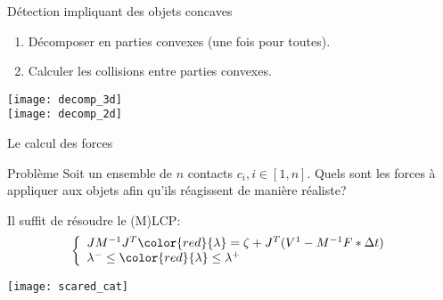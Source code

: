 \begin{frame}{Détection impliquant des objets concaves}
    \begin{enumerate}
        \item Décomposer en parties convexes (une fois pour toutes).
        \item Calculer les collisions entre parties convexes.
    \end{enumerate}
    \begin{center}
        \texttt{[image: decomp\_3d]}\\
        \texttt{[image: decomp\_2d]}
    \end{center}
\end{frame}

\begin{frame}{Le calcul des forces}
    \begin{block}{Problème}
         Soit un ensemble de $n$ contacts $c_i, i \in [1, n]$. Quels sont les
         forces à appliquer aux objets afin qu’ils réagissent de manière
         réaliste?
    \end{block}
    \pause
    Il suffit de résoudre le (M)LCP:
    \[
    \left\{
        \begin{array}{l}
            JM^{-1}J^T {\color{red}{\lambda}} = \zeta +
            J^T(V^1 - M^{-1}F * \Delta t)\\
            \lambda^- \leq {\color{red}{\lambda}} \leq \lambda^+ %
        \end{array}
    \right.
    \]
    \begin{center}
        \texttt{[image: scared\_cat]}
    \end{center}
\end{frame}
